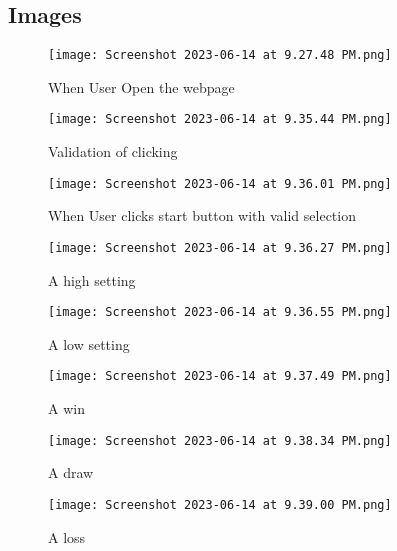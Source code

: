 \documentclass{article}
\begin{document}
\begin{flushleft}
\begin{enumerate}
\section{Images}
\begin{figure}[h] %
\centering %
\texttt{[image: Screenshot 2023-06-14 at 9.27.48 PM.png]} %
\caption{When User Open the webpage} %
\label{fig:my_image} %
\end{figure}
\begin{figure}[h] %
\centering %
\texttt{[image: Screenshot 2023-06-14 at 9.35.44 PM.png]} %
\caption{Validation of clicking} %
\label{fig:my_image} %
\end{figure}
\begin{figure}[h] %
\centering %
\texttt{[image: Screenshot 2023-06-14 at 9.36.01 PM.png]} %
\caption{When User clicks start button with valid selection} %
\label{fig:my_image} %
\end{figure}
\begin{figure}[h] %
\centering %
\texttt{[image: Screenshot 2023-06-14 at 9.36.27 PM.png]} %
\caption{A high setting} %
\label{fig:my_image} %
\end{figure}
\begin{figure}[h] %
\centering %
\texttt{[image: Screenshot 2023-06-14 at 9.36.55 PM.png]} %
\caption{A low setting} %
\label{fig:my_image} %
\end{figure}
\begin{figure}[h] %
\centering %
\texttt{[image: Screenshot 2023-06-14 at 9.37.49 PM.png]} %
\caption{A win} %
\label{fig:my_image} %
\end{figure}
\begin{figure}[h] %
\centering %
\texttt{[image: Screenshot 2023-06-14 at 9.38.34 PM.png]} %
\caption{A draw} %
\label{fig:my_image} %
\end{figure}
\begin{figure}[h] %
\centering %
\texttt{[image: Screenshot 2023-06-14 at 9.39.00 PM.png]} %
\caption{A loss} %
\label{fig:my_image} %
\end{figure}
\end{enumerate}
    \end{flushleft}
\end{document}
